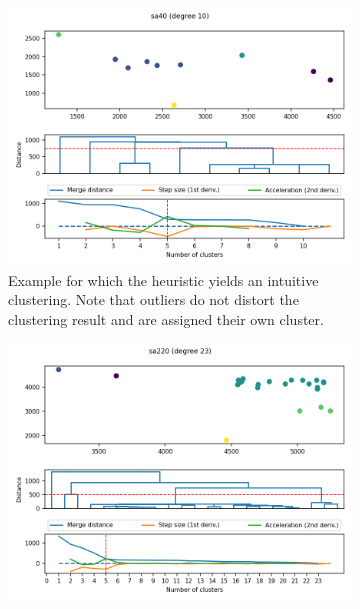 \documentclass[
	fontsize=10pt, %
	twoside=false, %
	secnumdepth=1, %
]{kaobook}
\begin{document}
\begin{figure}[h]
  \centering
  \begin{subfigure}{0.48\linewidth}
    \includegraphics[width=1.0\textwidth]{dendrograms/sa40.png}
    \caption{
      Example for which the heuristic yields an intuitive clustering. Note that
      outliers do not distort the clustering result and are assigned their own cluster.
    }
  \end{subfigure}
  \begin{subfigure}{0.48\linewidth}
    \includegraphics[width=\textwidth]{dendrograms/sa220.png}

\end{subfigure}
\end{figure}
\end{document}
